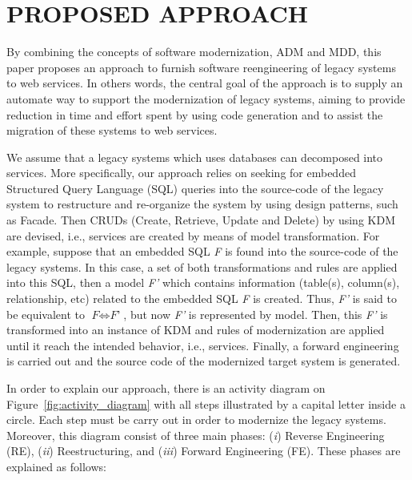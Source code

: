 \documentclass[a4paper,twoside]{article}
\begin{document}
\section{\uppercase{Proposed Approach}}
\label{sec:proposed_approach}


\noindent By combining the concepts of software modernization, ADM and MDD, this paper proposes an approach to furnish software reengineering of legacy systems to web services. In others words, the central goal of the approach is to supply an automate way to support the modernization of legacy systems, aiming to provide reduction in time and effort spent by using code generation and to assist the migration of these systems to web services.  

We assume that a legacy systems which uses databases can decomposed into services. More specifically, our approach relies on seeking for embedded Structured Query Language (SQL) queries into the source-code of the legacy system  to restructure and re-organize the system by using design patterns, such as Facade. Then CRUDs (Create, Retrieve, Update and Delete) by using KDM are devised, i.e., services are created by means of model transformation. For example, suppose that an embedded SQL \textit{F} is found into the source-code of the legacy systems. In this case, a set of both transformations and rules are applied into this SQL, then a model \textit{F'} which contains information (table(s), column(s), relationship, etc) related to the embedded SQL \textit{F} is created. Thus, \textit{F'} is said to be equivalent to $\textit{F} \Leftrightarrow \textit{F'} $, but now \textit{F'} is represented by model. Then, this \textit{F'} is transformed into an instance of KDM and rules of modernization are applied until it reach the intended behavior, i.e., services. Finally, a forward engineering is carried out and the source code of the modernized target system is generated. 



In order to explain our approach, there is an activity diagram on Figure~\ref{fig:activity_diagram} with all steps illustrated by a capital letter inside a circle. Each step must be carry out in order to modernize the legacy systems. Moreover, this diagram consist of three main phases: (\textit{i}) Reverse Engineering (RE), (\textit{ii}) Reestructuring, and (\textit{iii}) Forward Engineering (FE). These phases are explained as follows:
\end{document}
